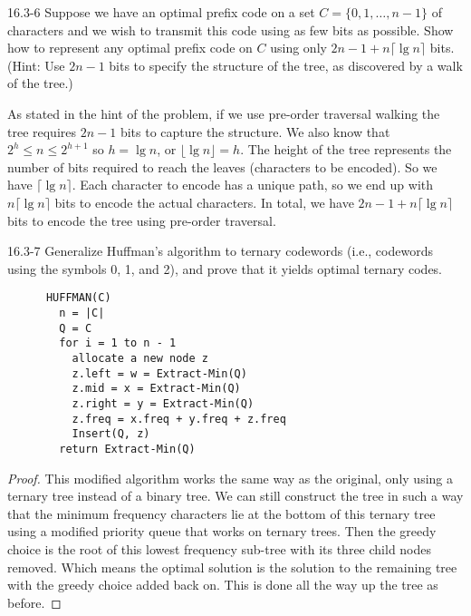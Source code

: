 





\homeworkheader{\classnameandsection}

\begin{problem}{16.3-6}
  Suppose we have an optimal prefix code on a set $C = \{0,1,\ldots,n-1\}$ of characters and we wish to transmit this
  code using as few bits as possible. Show how to represent any optimal prefix code on $C$ using only $2n - 1 + n \lceil
  \lg n \rceil$ bits. (Hint: Use $2n - 1$ bits to specify the structure of the tree, as discovered by a walk of the
  tree.)
  \begin{solution}
    As stated in the hint of the problem, if we use pre-order traversal walking the tree requires $2n - 1$ bits to
    capture the structure. We also know that $2^h \le n \le 2^{h + 1}$ so $h = \lg n$, or $\lfloor \lg n \rfloor = h$.
    The height of the tree represents the number of bits required to reach the leaves (characters to be encoded). So we
    have $\lceil \lg n \rceil$. Each character to encode has a unique path, so we end up with $n \lceil \lg n \rceil$
    bits to encode the actual characters.  In total, we have $2n - 1 + n \lceil \lg n \rceil$ bits to encode the tree
    using pre-order traversal.
  \end{solution}
\end{problem}

\begin{problem}{16.3-7}
  Generalize Huffman's algorithm to ternary codewords (i.e., codewords using the symbols 0, 1, and 2), and prove that it
  yields optimal ternary codes.
  \begin{solution}
    \begin{lstlisting}
      HUFFMAN(C)
        n = |C|
        Q = C
        for i = 1 to n - 1
          allocate a new node z
          z.left = w = Extract-Min(Q)
          z.mid = x = Extract-Min(Q)
          z.right = y = Extract-Min(Q)
          z.freq = x.freq + y.freq + z.freq
          Insert(Q, z)
        return Extract-Min(Q)
    \end{lstlisting}
    \begin{proof}
      This modified algorithm works the same way as the original, only using a ternary tree instead of a binary tree.
      We can still construct the tree in such a way that the minimum frequency characters lie at the bottom of this
      ternary tree using a modified priority queue that works on ternary trees. Then the greedy choice is the root of
      this lowest frequency sub-tree with its three child nodes removed. Which means the optimal solution is the solution
      to the remaining tree with the greedy choice added back on.  This is done all the way up the tree as before.
    \end{proof}
  \end{solution}
\end{problem}

